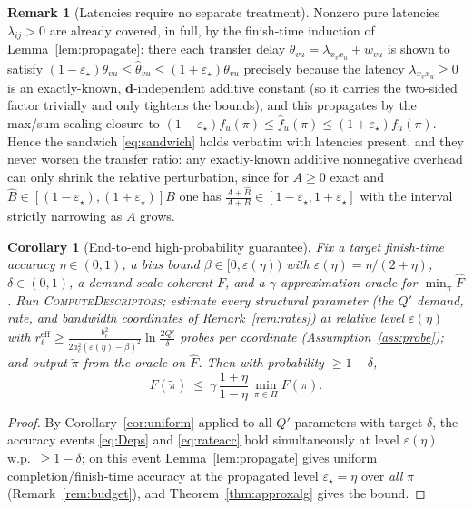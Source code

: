 \documentclass{amsart}
\newtheorem{corollary}{Corollary}
\theoremstyle{definition}
\newtheorem{remark}{Remark}
\begin{document}
\begin{remark}[Latencies require no separate treatment]\label{rem:latency}
Nonzero pure latencies $\lambda_{ij}>0$ are already covered, in full, by the
finish-time induction of Lemma~\ref{lem:propagate}: there each transfer delay
$\theta_{vu}=\lambda_{x_vx_u}+w_{vu}$ is shown to satisfy
$(1-\varepsilon_\star)\theta_{vu}\le\widehat\theta_{vu}\le
(1+\varepsilon_\star)\theta_{vu}$ precisely because the latency
$\lambda_{x_vx_u}\ge0$ is an exactly-known, $\mathbf d$-independent additive
constant (so it carries the two-sided factor trivially and only tightens the
bounds), and this propagates by the max/sum scaling-closure to
$(1-\varepsilon_\star)f_u(\pi)\le\widehat f_u(\pi)\le
(1+\varepsilon_\star)f_u(\pi)$. Hence the sandwich \eqref{eq:sandwich} holds
verbatim with latencies present, and they never worsen the transfer ratio: any
exactly-known additive nonnegative overhead can only shrink the relative
perturbation, since for $A\ge0$ exact and $\widehat B\in[(1-\varepsilon_\star),
(1+\varepsilon_\star)]B$ one has
$\frac{A+\widehat B}{A+B}\in[1-\varepsilon_\star,1+\varepsilon_\star]$ with the
interval strictly narrowing as $A$ grows.
\end{remark}

\begin{corollary}[End-to-end high-probability guarantee]\label{cor:e2e}
Fix a target finish-time accuracy $\eta\in(0,1)$, a bias bound
$\beta\in[0,\varepsilon(\eta))$ with $\varepsilon(\eta)=\eta/(2+\eta)$,
$\delta\in(0,1)$, a demand-scale-coherent $F$, and a $\gamma$-approximation
oracle for $\min_\pi\widehat F$. Run \textsc{ComputeDescriptors}; estimate every
structural parameter (the $Q'$ demand, rate, and bandwidth coordinates of
Remark~\ref{rem:rates}) at relative level $\varepsilon(\eta)$ with
$r_\ell^{\mathrm{eff}}\ge\frac{b_\ell^2}{2a_\ell^2(\varepsilon(\eta)-\beta)^2}\ln\frac{2Q'}{\delta}$
probes per coordinate (Assumption~\ref{ass:probe}); and output $\tilde\pi$ from
the oracle on $\widehat F$. Then with probability $\ge1-\delta$,
\[
F(\tilde\pi)\ \le\ \gamma\,\frac{1+\eta}{1-\eta}\,\min_{\pi\in\Pi}F(\pi).
\]
\end{corollary}

\begin{proof}
By Corollary~\ref{cor:uniform} applied to all $Q'$ parameters with target
$\delta$, the accuracy events \eqref{eq:Deps} and \eqref{eq:rateacc} hold
simultaneously at level $\varepsilon(\eta)$ w.p.\ $\ge1-\delta$; on this event
Lemma~\ref{lem:propagate} gives uniform completion/finish-time accuracy at the
propagated level $\varepsilon_\star=\eta$ over \emph{all} $\pi$
(Remark~\ref{rem:budget}), and Theorem~\ref{thm:approxalg} gives the bound.
\end{proof}
\end{document}
